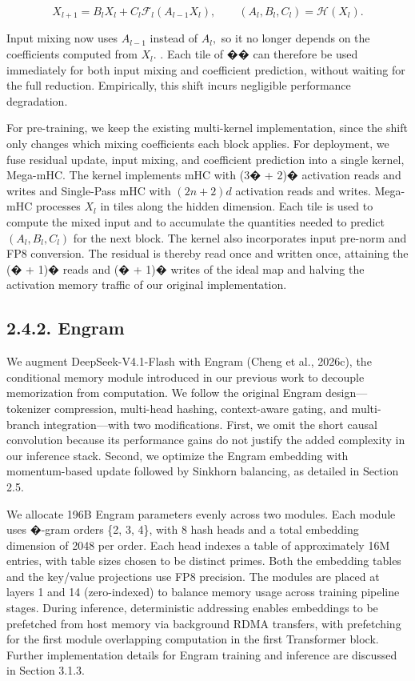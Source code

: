 \documentclass[
  10
]{article}
\begin{document}
\[
X _ {l + 1} = B _ {l} X _ {l} + C _ {l} \mathcal {F} _ {l} (A _ {l - 1} X _ {l}), \qquad (A _ {l}, B _ {l}, C _ {l}) = \mathcal {H} (X _ {l}).\tag{6}
\]

Input mixing now uses \(A _ { l - 1 }\) instead of \(A _ { l } ,\) so it
no longer depends on the coefficients computed from \(X _ { l } .\) .
Each tile of �� can therefore be used immediately for both input mixing
and coefficient prediction, without waiting for the full reduction.
Empirically, this shift incurs negligible performance degradation.

For pre-training, we keep the existing multi-kernel implementation,
since the shift only changes which mixing coefficients each block
applies. For deployment, we fuse residual update, input mixing, and
coefficient prediction into a single kernel, Mega-mHC. The kernel
implements mHC with (3� + 2)� activation reads and writes and
Single-Pass mHC with \(( 2 n + 2 ) d\) activation reads and writes.
Mega-mHC processes \(X _ { l }\) in tiles along the hidden dimension.
Each tile is used to compute the mixed input and to accumulate the
quantities needed to predict
\(\left( A _ { l } , B _ { l } , C _ { l } \right)\) for the next block.
The kernel also incorporates input pre-norm and FP8 conversion. The
residual is thereby read once and written once, attaining the (� + 1)�
reads and (� + 1)� writes of the ideal map and halving the activation
memory traffic of our original implementation.

\subsection{2.4.2. Engram}\label{engram}

We augment DeepSeek-V4.1-Flash with Engram (Cheng et al., 2026c), the
conditional memory module introduced in our previous work to decouple
memorization from computation. We follow the original Engram
design---tokenizer compression, multi-head hashing, context-aware
gating, and multi-branch integration---with two modifications. First, we
omit the short causal convolution because its performance gains do not
justify the added complexity in our inference stack. Second, we optimize
the Engram embedding with momentum-based update followed by Sinkhorn
balancing, as detailed in Section 2.5.

We allocate 196B Engram parameters evenly across two modules. Each
module uses �-gram orders \{2, 3, 4\}, with 8 hash heads and a total
embedding dimension of 2048 per order. Each head indexes a table of
approximately 16M entries, with table sizes chosen to be distinct
primes. Both the embedding tables and the key/value projections use FP8
precision. The modules are placed at layers 1 and 14 (zero-indexed) to
balance memory usage across training pipeline stages. During inference,
deterministic addressing enables embeddings to be prefetched from host
memory via background RDMA transfers, with prefetching for the first
module overlapping computation in the first Transformer block. Further
implementation details for Engram training and inference are discussed
in Section 3.1.3.
\end{document}
